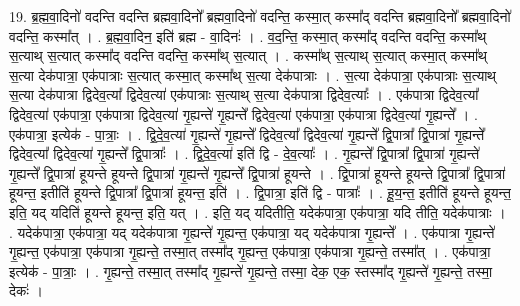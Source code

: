 \documentclass[17pt]{extarticle}
\begin{document}
19. ब्र॒ह्म॒वा॒दिनो॑ वदन्ति वदन्ति ब्रह्मवा॒दिनो᳚ ब्रह्मवा॒दिनो॑ वदन्ति॒ कस्मा॒त् कस्मा᳚द् वदन्ति ब्रह्मवा॒दिनो᳚ ब्रह्मवा॒दिनो॑ वदन्ति॒ कस्मा᳚त् । . ब्र॒ह्म॒वा॒दिन॒ इति॑ ब्रह्म - वा॒दिनः॑ । . व॒द॒न्ति॒ कस्मा॒त् कस्मा᳚द् वदन्ति वदन्ति॒ कस्मा᳚थ् स॒त्याथ् स॒त्यात् कस्मा᳚द् वदन्ति वदन्ति॒ कस्मा᳚थ् स॒त्यात् । . कस्मा᳚थ् स॒त्याथ् स॒त्यात् कस्मा॒त् कस्मा᳚थ् स॒त्या देक॑पात्रा॒ एक॑पात्राः स॒त्यात् कस्मा॒त् कस्मा᳚थ् स॒त्या देक॑पात्राः । . स॒त्या देक॑पात्रा॒ एक॑पात्राः स॒त्याथ् स॒त्या देक॑पात्रा द्विदेव॒त्या᳚ द्विदेव॒त्या॑ एक॑पात्राः स॒त्याथ् स॒त्या देक॑पात्रा द्विदेव॒त्याः᳚ । . एक॑पात्रा द्विदेव॒त्या᳚ द्विदेव॒त्या॑ एक॑पात्रा॒ एक॑पात्रा द्विदेव॒त्या॑ गृ॒ह्यन्ते॑ गृ॒ह्यन्ते᳚ द्विदेव॒त्या॑ एक॑पात्रा॒ एक॑पात्रा द्विदेव॒त्या॑ गृ॒ह्यन्ते᳚ । . एक॑पात्रा॒ इत्येक॑ - पा॒त्राः॒ । . द्वि॒दे॒व॒त्या॑ गृ॒ह्यन्ते॑ गृ॒ह्यन्ते᳚ द्विदेव॒त्या᳚ द्विदेव॒त्या॑ गृ॒ह्यन्ते᳚ द्वि॒पात्रा᳚ द्वि॒पात्रा॑ गृ॒ह्यन्ते᳚ द्विदेव॒त्या᳚ द्विदेव॒त्या॑ गृ॒ह्यन्ते᳚ द्वि॒पात्राः᳚ । . द्वि॒दे॒व॒त्या॑ इति॑ द्वि - दे॒व॒त्याः᳚ । . गृ॒ह्यन्ते᳚ द्वि॒पात्रा᳚ द्वि॒पात्रा॑ गृ॒ह्यन्ते॑ गृ॒ह्यन्ते᳚ द्वि॒पात्रा॑ हूयन्ते हूयन्ते द्वि॒पात्रा॑ गृ॒ह्यन्ते॑ गृ॒ह्यन्ते᳚ द्वि॒पात्रा॑ हूयन्ते । . द्वि॒पात्रा॑ हूयन्ते हूयन्ते द्वि॒पात्रा᳚ द्वि॒पात्रा॑ हूयन्त॒ इतीति॑ हूयन्ते द्वि॒पात्रा᳚ द्वि॒पात्रा॑ हूयन्त॒ इति॑ । . द्वि॒पात्रा॒ इति॑ द्वि - पात्राः᳚ । . हू॒य॒न्त॒ इतीति॑ हूयन्ते हूयन्त॒ इति॒ यद् यदिति॑ हूयन्ते हूयन्त॒ इति॒ यत् । . इति॒ यद् यदितीति॒ यदेक॑पात्रा॒ एक॑पात्रा॒ यदि तीति॒ यदेक॑पात्राः । . यदेक॑पात्रा॒ एक॑पात्रा॒ यद् यदेक॑पात्रा गृ॒ह्यन्ते॑ गृ॒ह्यन्त॒ एक॑पात्रा॒ यद् यदेक॑पात्रा गृ॒ह्यन्ते᳚ । . एक॑पात्रा गृ॒ह्यन्ते॑ गृ॒ह्यन्त॒ एक॑पात्रा॒ एक॑पात्रा गृ॒ह्यन्ते॒ तस्मा॒त् तस्मा᳚द् गृ॒ह्यन्त॒ एक॑पात्रा॒ एक॑पात्रा गृ॒ह्यन्ते॒ तस्मा᳚त् । . एक॑पात्रा॒ इत्येक॑ - पा॒त्राः॒ । . गृ॒ह्यन्ते॒ तस्मा॒त् तस्मा᳚द् गृ॒ह्यन्ते॑ गृ॒ह्यन्ते॒ तस्मा॒ देक॒ एक॒ स्तस्मा᳚द् गृ॒ह्यन्ते॑ गृ॒ह्यन्ते॒ तस्मा॒ देकः॑ । \newline
\end{document}
